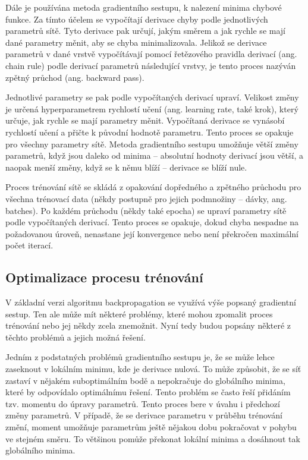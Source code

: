 Dále je používána metoda gradientního sestupu, k nalezení minima chybové
funkce. Za tímto účelem se vypočítají derivace chyby podle jednotlivých
parametrů sítě. Tyto derivace pak určují, jakým směrem a jak rychle se mají
dané parametry měnit, aby se chyba minimalizovala. Jelikož se derivace
parametrů v dané vrstvě vypočítávají pomocí řetězového pravidla derivací (ang.
chain rule) podle derivací parametrů následující vrstvy, je tento proces
nazýván zpětný průchod (ang. backward pass).

Jednotlivé parametry se pak podle vypočítaných derivací upraví. Velikost změny
je určená hyperparametrem rychlostí učení (ang. learning rate, také krok),
který určuje, jak rychle se mají parametry měnit. Vypočítaná derivace se
vynásobí rychlostí učení a přičte k původní hodnotě parametru. Tento proces se
opakuje pro všechny parametry sítě. Metoda gradientního sestupu umožňuje větší
změny parametrů, když jsou daleko od minima – absolutní hodnoty derivací jsou
větší, a naopak menší změny, když se k němu blíží – derivace se blíží nule.

Proces trénování sítě se skládá z opakování dopředného a zpětného průchodu pro
všechna trénovací data (někdy postupně pro jejich podmnožiny – dávky, ang.
batches). Po každém průchodu (někdy také epocha) se upraví parametry sítě podle
vypočítaných derivací. Tento proces se opakuje, dokud chyba nespadne na
požadovanou úroveň, nenastane její konvergence nebo není překročen maximální
počet iterací.

\subsection{Optimalizace procesu trénování}

V základní verzi algoritmu backpropagation se využívá výše popsaný gradientní
sestup. Ten ale může mít některé problémy, které mohou zpomalit proces
trénování nebo jej někdy zcela znemožnit. Nyní tedy budou popsány některé z
těchto problémů a jejich možná řešení.

Jedním z podstatných problémů gradientního sestupu je, že se může lehce
zaseknout v lokálním minimu, kde je derivace nulová. To může způsobit, že se
síť zastaví v nějakém suboptimálním bodě a nepokračuje do globálního minima,
které by odpovídalo optimálnímu řešení. Tento problém se často řeší přidáním
tzv. momentu do úpravy parametrů. Tento proces bere v úvahu i předchozí změny
parametrů. V případě, že se derivace parametru v průběhu trénování změní,
moment umožňuje parametrům ještě nějakou dobu pokračovat v pohybu ve stejném
směru. To většinou pomůže překonat lokální minima a dosáhnout tak globálního
minima.

